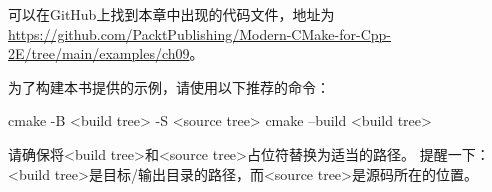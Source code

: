 可以在GitHub上找到本章中出现的代码文件，地址为 \url{https://github.com/PacktPublishing/Modern-CMake-for-Cpp-2E/tree/main/examples/ch09}。

为了构建本书提供的示例，请使用以下推荐的命令：

\begin{shell}
cmake -B <build tree> -S <source tree>
cmake --build <build tree>
\end{shell}

请确保将<build tree>和<source tree>占位符替换为适当的路径。 提醒一下：<build tree>是目标/输出目录的路径，而<source tree>是源码所在的位置。